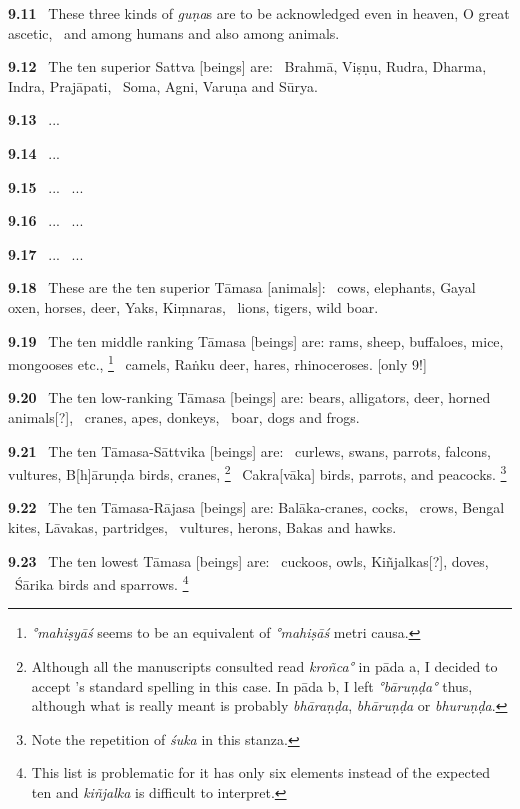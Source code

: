 \documentclass{article}
\newcommand{\skt}[1]{\textit{#1}}
\begin{document}
\textbf{9.11}%
\ These three kinds of \skt{guṇa}s are to be acknowledged even in heaven, O great ascetic,%
\ and among humans and also among animals.%


\textbf{9.12}%
\ The ten superior Sattva [beings] are:%
\                  Brahmā, Viṣṇu, Rudra, Dharma, Indra, Prajāpati,%
\ Soma, Agni, Varuṇa and Sūrya.%


\textbf{9.13}%
\ ...%


\textbf{9.14}%
\ ...%


\textbf{9.15}%
\ ...%
\ ...%


\textbf{9.16}%
\ ...%
\ ...%


\textbf{9.17}%
\ ...%
\ ...%


\textbf{9.18}%
\ These are the ten superior Tāmasa [animals]:%
\                         cows, elephants, Gayal oxen, horses, deer, Yaks, Kiṃnaras,%
\ lions, tigers, wild boar.%


\textbf{9.19}%
\ The ten middle ranking Tāmasa [beings] are: rams, sheep, buffaloes, mice, mongooses etc.,%
\footnote{\skt{°mahiṣyāś} seems to be an equivalent of \skt{°mahiṣāś} metri causa. }%
\ camels, Raṅku  deer, hares, rhinoceroses. [only 9!]%


\textbf{9.20}%
\ The ten low-ranking Tāmasa [beings] are: bears, alligators, deer, horned animals[?],%
\                         cranes, apes, donkeys,%
\ boar, dogs and frogs.%


\textbf{9.21}%
\ The ten Tāmasa-Sāttvika [beings] are:%
\                 curlews, swans, parrots, falcons, vultures, B[h]āruṇḍa birds, cranes,%
\footnote{Although all the manuscripts consulted read \skt{kroñca°} in pāda a, I decided                to accept \Ed's standard spelling in this case. In pāda b, I left \skt{°bāruṇḍa°}                thus, although what is really meant is probably \skt{bhāraṇḍa}, \skt{bhāruṇḍa} or \skt{bhuruṇḍa}. }%
\ Cakra[vāka] birds, parrots, and peacocks.%
\footnote{Note the repetition of \skt{śuka} in this stanza. }%


\textbf{9.22}%
\ The ten Tāmasa-Rājasa [beings] are: Balāka-cranes, cocks,%
\                         crows, Bengal kites, Lāvakas, partridges,%
\ vultures, herons, Bakas and hawks.%


\textbf{9.23}%
\ The ten lowest Tāmasa [beings] are:%
\                         cuckoos, owls, Kiñjalkas[?], doves,%
\ Śārika birds and sparrows.%
\footnote{This list is problematic for it has only six elements instead of the expected ten                 and \skt{kiñjalka} is difficult to interpret. }%
\end{document}
